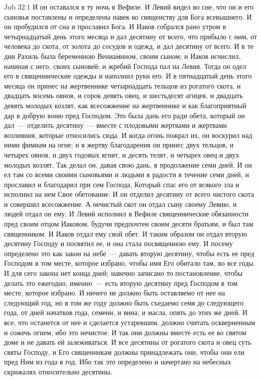 \vs Jub 32:1
И он оставался в ту ночь в Вефиле. И Левий видел
во сне, что он и его сыновья поставлены и
определены навек ко священству для Бога
всевышнего. И он пробудился от сна и прославил
Бога. И Иаков собрался рано утром в четырнадцатый
день этого месяца и дал десятину от всего, что
прибыло с ним, от человека до скота, от золота до
сосудов и одежд, и дал десятину от всего. И в те
дни Рахиль была беременною Вениамином, своим
сыном; и Иаков исчислил, начиная с него, своих
сыновей; и жребий Господа пал на Левия. Тогда он
одел его в священнические одежды и наполнил руки
его. И в пятнадцатый день этого месяца он принес
на жертвеннике четырнадцать тельцов из рогатого
скота, и двадцать восемь овнов, и сорок девять
овец, и шестьдесят агнцев, и двадцать девять
молодых козлят, как всесожжение на жертвеннике и
как благоприятный дар в добрую воню пред
Господом. Это была дань его ради обета, который он
дал~--- отделить десятину~--- вместе с плодовыми
жертвами и жертвами возлияния, которые
относились сюда. И когда огонь пожрал их, он
воскурил над ними фимиам на огне; и в жертву
благодарения он принес двух тельцов, и
четырех овнов, и двух годовых ягнят, и десять
телят, и четырех овец и двух молодых козлят. Так
делал он, давая свою дань, в продолжение семи
дней. И он ел там со всеми своими сыновьями и
людьми в радости в течение семи дней, и прославил
и благодарил при сем Господа, Который спас его от
всякого зла и исполнил на нем Свое обетование. И
он отделил десятину от всего чистого скота и
совершил всесожжение. А нечистый скот он отдал
сыну своему Левию, и людей отдал он ему. И Левий
исполнил в Вефиле священнические обязанности
пред своим отцом Иаковом, будучи предпочтен
своим десяти братьям, и был там священником. И
Иаков отдал ему свой обет. И таким образом он
отдал вторую десятину Господу и посвятил ее, и
она стала посвященною ему. И посему определено
это как закон на небе~--- давать вторую десятину,
чтобы есть ее пред Господом в том месте, которое
избрано, чтобы имя Его обитало там, во все годы. И
для сего закона нет конца дней; навечно записано
то постановление, чтобы делать это ежегодно, именно~---
есть вторую десятину пред Господом в том
месте, которое избрано. И ничего не должно быть
оставляемо от нее на следующий год, но в том же
году должно быть съедаемо семя до следующего
года, от дней начатков года, семени, и вина, и
масла, опять до этих же дней. И все, что останется
от нее и сделается устаревшим, должно считать
оскверненным и сожечь огнем, ибо это нечистое. И
так они должны вместе есть ее во святом доме и не
давать ей залеживаться. И все десятины от
рогатого скота и овец суть святы Господу, и Его
священникам должны принадлежать они, чтобы они
ели пред Ним из года в год. Ибо так это определено
и начертано на небесных скрижалях относительно
десятины.

